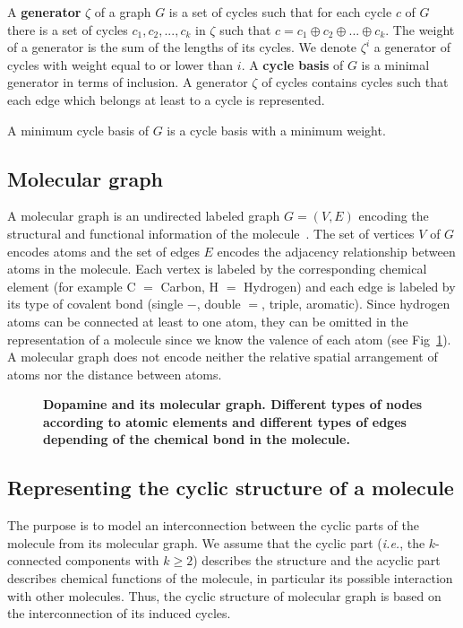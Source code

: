 \documentclass[10pt,letterpaper]{article}
\begin{document}
 A {\bf generator} $\zeta$ of a graph $G$ is a set of cycles such that for each cycle $c$ of $G$ there is a set of cycles $c_1,c_2,...,c_k$ in $ \zeta $ such that $c = c_1 \oplus c_2 \oplus  ... \oplus c_k$. The weight of a generator is the sum of the lengths of its cycles. We denote $\zeta^i$ a generator of cycles with weight equal to or lower than $i$. A {\bf cycle basis} of $G$ is a minimal generator in terms of inclusion. A generator $\zeta$ of cycles contains cycles such that each edge which belongs at least to a cycle is represented. 
 
A minimum cycle basis of $G$ is a cycle basis with a minimum weight.


\subsection*{Molecular graph}

A molecular graph is an undirected labeled graph $G=(V,E)$ encoding the structural and functional information of the molecule~\cite{Gasteiger2003}. The set of vertices $V$ of $G$ encodes atoms and the set of edges $E$ encodes the adjacency relationship between atoms in the molecule. Each vertex is labeled by the corresponding chemical element (for example C $=$ Carbon, H $=$ Hydrogen) and each edge is labeled by its type of covalent bond (single $-$, double $=$, triple, aromatic). Since hydrogen atoms can be connected at least to one atom, they can be omitted in the representation of a molecule since we know the valence of each atom (see Fig~\ref{fig1}). A molecular graph does not encode neither the relative spatial arrangement of atoms nor the distance between atoms.


\begin{figure}[!h]

	\caption{
		\bf{Dopamine and its molecular graph.} 
		Different types of nodes according to atomic elements and different types of edges depending of the chemical bond in the molecule.}
		\label{fig1}
\end{figure}

\subsection*{Representing the cyclic structure of a molecule}

The purpose is to model an interconnection between the cyclic parts of the molecule from its  molecular graph. We assume that the cyclic part (\textit{i.e.}, the $k$-connected components with $k \geq 2$) describes the structure and the acyclic part describes chemical functions of the molecule, in particular its possible interaction with other molecules.  Thus, the cyclic structure of molecular graph is based on the interconnection of its induced cycles. 
\end{document}
